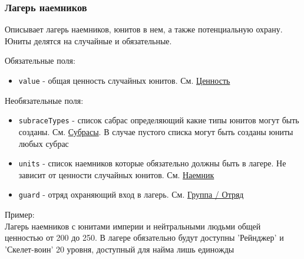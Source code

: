 \subsubsection{Лагерь наемников}
\label{mercenary}
Описывает лагерь наемников, юнитов в нем, а также потенциальную охрану. Юниты делятся на случайные и обязательные.

Обязательные поля:
\begin{itemize}
\item \texttt{value} - общая ценность случайных юнитов. См. \hyperref[value]{Ценность}
\end{itemize}

Необязательные поля:
\begin{itemize}
\item \texttt{subraceTypes} - список сабрас определяющий какие типы юнитов могут быть созданы. См. \hyperref[subraceTypes]{Субрасы}. В случае пустого списка могут быть созданы юниты любых субрас
\item \texttt{units} - список наемников которые обязательно должны быть в лагере. Не зависит от ценности случайных юнитов. См. \hyperref[mercenaryUnit]{Наемник}
\item \texttt{guard} - отряд охраняющий вход в лагерь. См. \hyperref[group]{Группа / Отряд}
\end{itemize}

Пример:\\
Лагерь наемников с юнитами империи и нейтральными людьми общей ценностью от 200 до 250.
В лагере обязательно будут доступны 'Рейнджер' и 'Скелет-воин' 20 уровня, доступный для найма лишь единожды

\begin{figure}[H]

\end{figure}